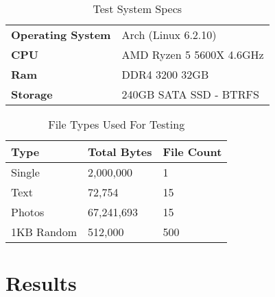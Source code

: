 \begin{table}[h!]
	\caption{Test System Specs}
	\label{tab:test-system-specs}
	\centering
	\begin{tabular}{ l | l | }
		\textbf{Operating System} & Arch (Linux 6.2.10)      \\
		\textbf{CPU}              & AMD Ryzen 5 5600X 4.6GHz \\
		\textbf{Ram}              & DDR4 3200 32GB           \\
		\textbf{Storage}          & 240GB SATA SSD - BTRFS   \\
	\end{tabular}
\end{table}

\begin{table}[h!]
	\caption{File Types Used For Testing}
	\label{tab:file-types-used-for-testing}
	\centering
	\begin{tabular}{ l l l }
		\textbf{Type} & \textbf{Total Bytes} & \textbf{File Count} \\
		\hline
		Single        & 2,000,000            & 1                   \\
		\hline
		Text          & 72,754               & 15                  \\
		\hline
		Photos        & 67,241,693           & 15                  \\
		\hline
		1KB Random    & 512,000              & 500                 \\
		\hline
	\end{tabular}
\end{table}

\newpage

\section{Results}
